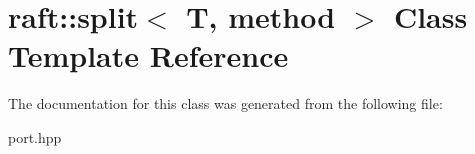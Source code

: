\hypertarget{classraft_1_1split}{}\section{raft\+:\+:split$<$ T, method $>$ Class Template Reference}
\label{classraft_1_1split}


The documentation for this class was generated from the following file\+:\begin{DoxyCompactItemize}
\item 
port.\+hpp\end{DoxyCompactItemize}
